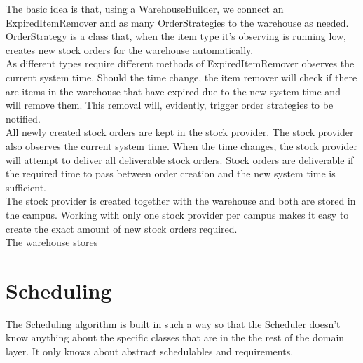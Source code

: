 \documentclass[12pt]{article}
\begin{document}
The basic idea is that, using a WarehouseBuilder, we connect an ExpiredItemRemover and as many OrderStrategies to the warehouse as needed.\\ OrderStrategy is a class that, when the item type it's observing is running low, creates new stock orders for the warehouse automatically.\\
As different types require different methods of 
ExpiredItemRemover observes the current system time. Should the time change, the item remover will check if there are items in the warehouse that have expired due to the new system time and will remove them. This removal will, evidently, trigger order strategies to be notified.\\
All newly created stock orders are kept in the stock provider. The stock provider also observes the current system time. When the time changes, the stock provider will attempt to deliver all deliverable stock orders. Stock orders are deliverable if the required time to pass between order creation and the new system time is sufficient.\\
The stock provider is created together with the warehouse and both are stored in the campus. Working with only one stock provider per campus makes it easy to create the exact amount of new stock orders required.\\
The warehouse stores 

\section{Scheduling}
The Scheduling algorithm is built in such a way so that the Scheduler doesn't know anything about the specific classes that are in the the rest of the domain layer. It only knows about abstract schedulables and requirements.
\end{document}
